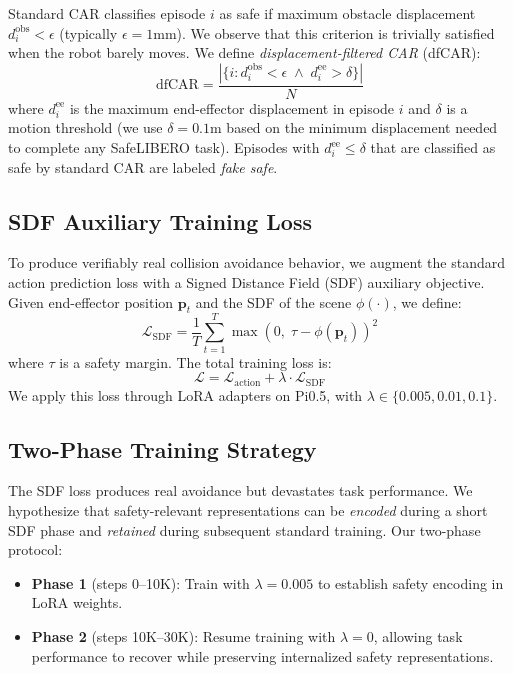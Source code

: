 \documentclass[letterpaper]{article}
\begin{document}
Standard CAR classifies episode $i$ as safe if maximum obstacle displacement $d_i^{\text{obs}} < \epsilon$ (typically $\epsilon = 1$mm). We observe that this criterion is trivially satisfied when the robot barely moves. We define \emph{displacement-filtered CAR} (dfCAR):
\begin{equation}
    \text{dfCAR} = \frac{|\{i : d_i^{\text{obs}} < \epsilon \;\wedge\; d_i^{\text{ee}} > \delta\}|}{N}
\end{equation}
where $d_i^{\text{ee}}$ is the maximum end-effector displacement in episode $i$ and $\delta$ is a motion threshold (we use $\delta = 0.1$m based on the minimum displacement needed to complete any SafeLIBERO task). Episodes with $d_i^{\text{ee}} \leq \delta$ that are classified as safe by standard CAR are labeled \emph{fake safe}.

\subsection{SDF Auxiliary Training Loss}
\label{sec:sdf_loss}

To produce verifiably real collision avoidance behavior, we augment the standard action prediction loss with a Signed Distance Field (SDF) auxiliary objective. Given end-effector position $\mathbf{p}_t$ and the SDF of the scene $\phi(\cdot)$, we define:
\begin{equation}
    \mathcal{L}_{\text{SDF}} = \frac{1}{T}\sum_{t=1}^{T} \max(0, \; \tau - \phi(\mathbf{p}_t))^2
\end{equation}
where $\tau$ is a safety margin. The total training loss is:
\begin{equation}
    \mathcal{L} = \mathcal{L}_{\text{action}} + \lambda \cdot \mathcal{L}_{\text{SDF}}
\end{equation}
We apply this loss through LoRA adapters on Pi0.5, with $\lambda \in \{0.005, 0.01, 0.1\}$.

\subsection{Two-Phase Training Strategy}
\label{sec:two_phase_method}

The SDF loss produces real avoidance but devastates task performance. We hypothesize that safety-relevant representations can be \emph{encoded} during a short SDF phase and \emph{retained} during subsequent standard training. Our two-phase protocol:
\begin{itemize}
    \item \textbf{Phase 1} (steps 0--10K): Train with $\lambda = 0.005$ to establish safety encoding in LoRA weights.
    \item \textbf{Phase 2} (steps 10K--30K): Resume training with $\lambda = 0$, allowing task performance to recover while preserving internalized safety representations.
\end{itemize}
\end{document}
